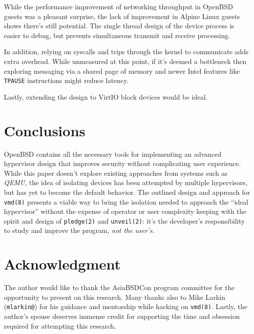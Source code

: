 \documentclass[conference]{IEEEtran}
\begin{document}
While the performance improvement of networking throughput in OpenBSD
guests was a pleasant surprise, the lack of improvement in Alpine
Linux guests shows there's still potential. The single thread design
of the device process is easier to debug, but prevents simultaneous
transmit and receive processing.

In addition, relying on syscalls and trips through the kernel to
communicate adds extra overhead. While unmeasured at this point, if
it's deemed a bottleneck then exploring messaging via a shared page of
memory and newer Intel features like \texttt{TPAUSE} instructions
might reduce latency.

Lastly, extending the design to VirtIO block devices would be ideal.


\vspace{5mm}
\section{Conclusions}
OpenBSD contains all the necessary tools for implementing an advanced
hypervisor design that improves security without complicating user
experience. While this paper doesn't explore existing approaches from
systems such as \emph{QEMU}, the idea of isolating devices has been
attempted by multiple hypervisors, but has yet to become the default
behavior. The outlined design and approach for \texttt{vmd(8)}
presents a viable way to bring the isolation needed to approach the
``ideal hypervisor'' without the expense of operator or user
complexity keeping with the spirit and design of \texttt{pledge(2)}
and \texttt{unveil(2)}: it's the developer's responsibility to study
and improve the program, \emph{not the user's.}


\vspace{5mm}
\section*{Acknowledgment}
The author would like to thank the AsiaBSDCon program committee for
the opportunity to present on this research. Many thanks also to Mike
Larkin (\texttt{mlarkin@}) for his guidance and mentorship while
hacking on \texttt{vmd(8)}. Lastly, the author's spouse deserves
immense credit for supporting the time and obsession required for
attempting this research.
\end{document}
